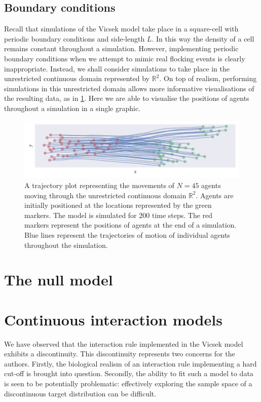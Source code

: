 \subsection{Boundary conditions}

Recall that simulations of the Vicsek model take place in a square-cell with
periodic boundary conditions and side-length $L$. In this way the density of a
cell remains constant throughout a simulation. However, implementing periodic
boundary conditions when we attempt to mimic real flocking events is clearly
inappropriate. Instead, we shall consider simulations to take place in the
unrestricted continuous domain represented by $\mathbb{R}^2$. On top of
realism, performing simulations in this unrestricted domain allows more
informative visualisations of the resulting data, as in
\cref{fig:example_traj}. Here we are able to visualise the positions of agents
throughout a simulation in a single graphic.

\begin{figure}[tb]
    \includegraphics{example_traj_plot.pdf}
    \caption{A trajectory plot representing the movements of $N=45$ agents
      moving through the unrestricted continuous domain $\mathbb{R}^2$.
      Agents are initially positioned at the locations represented by the
      green markers. The model is simulated for $200$ time steps. The red
      markers represent the positions of agents at the end of a simulation. Blue
      lines represent the trajectories of motion of individual agents throughout the
      simulation.}
    \label{fig:example_traj}
\end{figure}

\section{The null model}

\section{Continuous interaction models}

We have observed that the interaction rule implemented in the Vicsek model
exhibits a discontinuity. This discontinuity represents two concerns for the
authors. Firstly, the biological realism of an interaction rule implementing a
hard cut-off is brought into question. Secondly, the ability to fit such a
model to data is seen to be potentially problematic: effectively exploring the
sample space of a discontinuous target distribution can be difficult.

